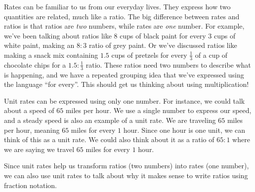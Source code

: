 \documentclass{ximera}
\begin{document}
Rates can be familiar to us from our everyday lives. They express how two quantities are related, much like a ratio. The big difference between rates and ratios is that ratios are \emph{two} numbers, while rates are \emph{one} number. For example, we've been talking about ratios like $8$ cups of black paint for every $3$ cups of white paint, making an $8:3$ ratio of grey paint. Or we've discussed ratios like making a snack mix containing $1.5$ cups of pretzels for every $\frac{1}{3}$ of a cup of chocolate chips for a $1.5:\frac{1}{3}$ ratio. These ratios need two numbers to describe what is happening, and we have a repeated grouping idea that we've expressed using the language ``for every''. This should get us thinking about using multiplication! 

Unit rates can be expressed using only one number. For instance, we could talk about a speed of $65$ miles per hour. We use a single number to express our speed, and a steady speed is also an example of a unit rate. We are traveling $65$ miles per hour, meaning $65$ miles for every $1$ hour. Since one hour is one unit, we can think of this as a unit rate. We could also think about it as a ratio of $65:1$ where we are saying we travel $65$ miles for every $1$ hour. 

Since unit rates help us transform ratios (two numbers) into rates (one number), we can also use unit rates to talk about why it makes sense to write ratios using fraction notation.
\end{document}
